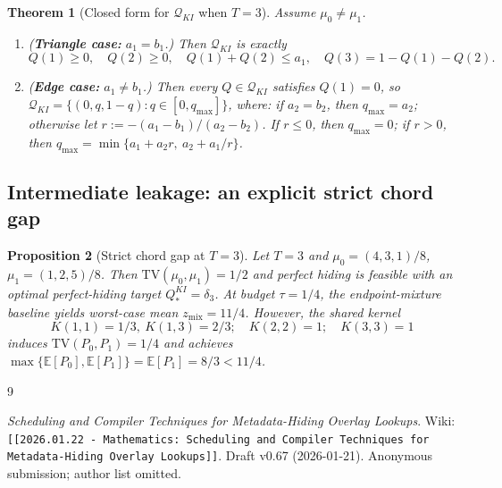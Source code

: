 \documentclass[11pt]{article}
\newtheorem{theorem}{Theorem}[section]
\newtheorem{proposition}[theorem]{Proposition}
\newcommand{\TV}{\mathrm{TV}}
\newcommand{\E}{\mathbb{E}}
\newcommand{\cQ}{\mathcal{Q}}
\begin{document}
\begin{theorem}[Closed form for $\cQ_{KI}$ when $T=3$]\label{thm:qki-n3}
Assume $\mu_0\neq \mu_1$.
\begin{enumerate}[leftmargin=1.5em]
\item (\textbf{Triangle case:} $a_1=b_1$.) Then $\cQ_{KI}$ is exactly
\[
Q(1)\ge 0,\quad Q(2)\ge 0,\quad Q(1)+Q(2)\le a_1,\quad Q(3)=1-Q(1)-Q(2).
\]
\item (\textbf{Edge case:} $a_1\neq b_1$.) Then every $Q\in\cQ_{KI}$ satisfies $Q(1)=0$, so $\cQ_{KI}=\{(0,q,1-q): q\in[0,q_{\max}]\}$, where:
if $a_2=b_2$, then $q_{\max}=a_2$; otherwise let $r:=-(a_1-b_1)/(a_2-b_2)$.
If $r\le 0$, then $q_{\max}=0$; if $r>0$, then $q_{\max}=\min\{a_1+a_2 r,\ a_2+a_1/r\}$.
\end{enumerate}
\end{theorem}

\subsection{Intermediate leakage: an explicit strict chord gap}
\begin{proposition}[Strict chord gap at $T=3$]\label{prop:mixture-gap}
Let $T=3$ and $\mu_0=(4,3,1)/8$, $\mu_1=(1,2,5)/8$.
Then $\TV(\mu_0,\mu_1)=1/2$ and perfect hiding is feasible with an optimal perfect-hiding target $Q_*^{KI}=\delta_3$.
At budget $\tau=1/4$, the endpoint-mixture baseline yields worst-case mean $z_{\mathrm{mix}}=11/4$.
However, the shared kernel
\[
K(1,1)=1/3,\ K(1,3)=2/3;\quad K(2,2)=1;\quad K(3,3)=1
\]
induces $\TV(P_0,P_1)=1/4$ and achieves $\max\{\E[P_0],\E[P_1]\}=\E[P_1]=8/3<11/4$.
\end{proposition}


\begin{thebibliography}{9}

\newblock \emph{Scheduling and Compiler Techniques for Metadata-Hiding Overlay Lookups}.
Wiki: \texttt{[[2026.01.22 - Mathematics: Scheduling and Compiler Techniques for Metadata-Hiding Overlay Lookups]]}.
\newblock Draft v0.67 (2026-01-21). Anonymous submission; author list omitted.

\end{thebibliography}
\end{document}
